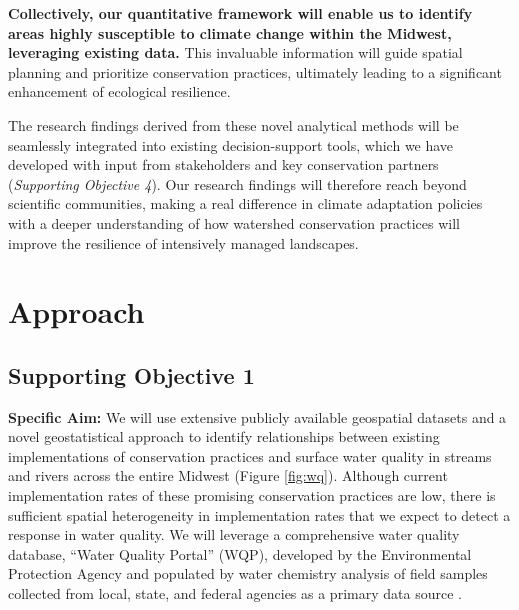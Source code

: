 \documentclass[12pt, class=article, crop=false]{standalone}
\begin{document}
\textbf{Collectively, our quantitative framework will enable us to identify areas highly susceptible to climate change within the Midwest, leveraging existing data.} This invaluable information will guide spatial planning and prioritize conservation practices, ultimately leading to a significant enhancement of ecological resilience.

The research findings derived from these novel analytical methods will be seamlessly integrated into existing decision-support tools, which we have developed with input from stakeholders and key conservation partners (\textit{Supporting Objective 4}).
Our research findings will therefore reach beyond scientific communities, making a real difference in climate adaptation policies with a deeper understanding of how watershed conservation practices will improve the resilience of intensively managed landscapes.

\section{Approach}

\subsection{Supporting Objective 1}

\textbf{Specific Aim:} We will use extensive publicly available geospatial datasets and a novel geostatistical approach to identify relationships between existing implementations of conservation practices and surface water quality in streams and rivers across the entire Midwest (Figure \ref{fig:wq}).
Although current implementation rates of these promising conservation practices are low, there is sufficient spatial heterogeneity in implementation rates that we expect to detect a response in water quality. We will leverage a comprehensive water quality database, ``Water Quality Portal'' (WQP), developed by the Environmental Protection Agency and populated by water chemistry analysis of field samples collected from local, state, and federal agencies as a primary data source \citep{washington_dc_national_water_quality_monitoring_council_united_states_geological_survey_usgs_environmental_protection_agency_epa_water_2021}.
\end{document}
